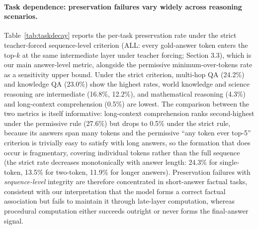 \documentclass{article} %
\begin{document}
\paragraph{Task dependence: preservation failures vary widely across reasoning scenarios.}
Table~\ref{tab:taskdecay} reports the per-task preservation rate under the strict teacher-forced sequence-level criterion (ALL: every gold-answer token enters the top-$k$ at the same intermediate layer under teacher forcing; Section 3.3), which is our main answer-level metric, alongside the permissive minimum-over-tokens rate as a sensitivity upper bound. Under the strict criterion, multi-hop QA (24.2\%) and knowledge QA (23.0\%) show the highest rates, world knowledge and science reasoning are intermediate (16.8\%, 12.2\%), and mathematical reasoning (4.3\%) and long-context comprehension (0.5\%) are lowest. The comparison between the two metrics is itself informative: long-context comprehension ranks second-highest under the permissive rule (27.6\%) but drops to 0.5\% under the strict rule, because its answers span many tokens and the permissive ``any token ever top-5'' criterion is trivially easy to satisfy with long answers, so the formation that does occur is fragmentary, covering individual tokens rather than the full sequence (the strict rate decreases monotonically with answer length: 24.3\% for single-token, 13.5\% for two-token, 11.9\% for longer answers). Preservation failures with \emph{sequence-level} integrity are therefore concentrated in short-answer factual tasks, consistent with our interpretation that the model forms a correct factual association but fails to maintain it through late-layer computation, whereas procedural computation either succeeds outright or never forms the final-answer signal.
\end{document}
